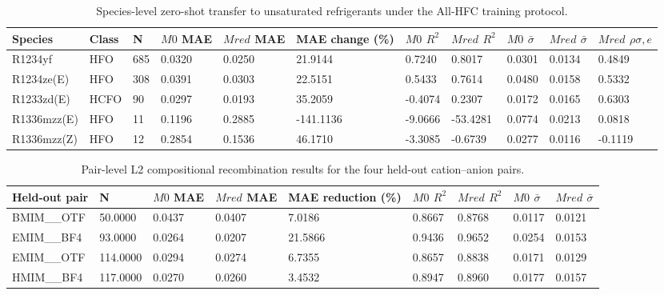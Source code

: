 \begin{table}[htbp]
\centering
\small
\caption{Species-level zero-shot transfer to unsaturated refrigerants under the All-HFC training protocol.}
\label{tab:unsat_species}
\begin{tabular}{lllllllllll}
\toprule
Species & Class & N & $M 0$ MAE & $M {red}$ MAE & MAE change (\%) & $M 0$ $R^2$ & $M {red}$ $R^2$ & $M 0$ $\bar\sigma$ & $M {red}$ $\bar\sigma$ & $M {red}$ $\rho {\sigma,e}$ \\
\midrule
R1234yf & HFO & 685 & 0.0320 & 0.0250 & 21.9144 & 0.7240 & 0.8017 & 0.0301 & 0.0134 & 0.4849 \\
R1234ze(E) & HFO & 308 & 0.0391 & 0.0303 & 22.5151 & 0.5433 & 0.7614 & 0.0480 & 0.0158 & 0.5332 \\
R1233zd(E) & HCFO & 90 & 0.0297 & 0.0193 & 35.2059 & -0.4074 & 0.2307 & 0.0172 & 0.0165 & 0.6303 \\
R1336mzz(E) & HFO & 11 & 0.1196 & 0.2885 & -141.1136 & -9.0666 & -53.4281 & 0.0774 & 0.0213 & 0.0818 \\
R1336mzz(Z) & HFO & 12 & 0.2854 & 0.1536 & 46.1710 & -3.3085 & -0.6739 & 0.0277 & 0.0116 & -0.1119 \\
\bottomrule
\end{tabular}
\end{table}

\begin{table}[htbp]
\centering
\small
\caption{Pair-level L2 compositional recombination results for the four held-out cation--anion pairs.}
\label{tab:l2_pairs}
\begin{tabular}{lllllllll}
\toprule
Held-out pair & N & $M 0$ MAE & $M {red}$ MAE & MAE reduction (\%) & $M 0$ $R^2$ & $M {red}$ $R^2$ & $M 0$ $\bar\sigma$ & $M {red}$ $\bar\sigma$ \\
\midrule
BMIM__OTF & 50.0000 & 0.0437 & 0.0407 & 7.0186 & 0.8667 & 0.8768 & 0.0117 & 0.0121 \\
EMIM__BF4 & 93.0000 & 0.0264 & 0.0207 & 21.5866 & 0.9436 & 0.9652 & 0.0254 & 0.0153 \\
EMIM__OTF & 114.0000 & 0.0294 & 0.0274 & 6.7355 & 0.8657 & 0.8838 & 0.0171 & 0.0129 \\
HMIM__BF4 & 117.0000 & 0.0270 & 0.0260 & 3.4532 & 0.8947 & 0.8960 & 0.0177 & 0.0157 \\
\bottomrule
\end{tabular}
\end{table}